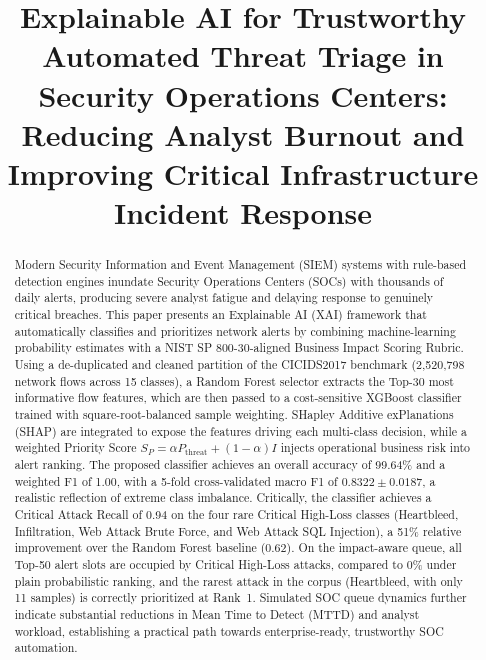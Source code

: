 \documentclass[conference]{IEEEtran}
\begin{document}
\title{Explainable AI for Trustworthy Automated Threat Triage in Security Operations Centers: Reducing Analyst Burnout and Improving Critical Infrastructure Incident Response}

\author{
\and
{}
}

\maketitle

\begin{abstract}
Modern Security Information and Event Management (SIEM) systems with 
rule-based detection engines inundate Security Operations Centers (SOCs) 
with thousands of daily alerts, producing severe analyst fatigue and 
delaying response to genuinely critical breaches. This paper presents 
an Explainable AI (XAI) framework that automatically classifies and 
prioritizes network alerts by combining machine-learning probability 
estimates with a NIST SP 800-30-aligned Business Impact Scoring Rubric. 
Using a de-duplicated and cleaned partition of the CICIDS2017 benchmark 
(2{,}520{,}798 network flows across 15 classes), a Random Forest selector extracts the Top-30 most informative flow features, which are then passed to a cost-sensitive XGBoost classifier trained with square-root-balanced sample weighting. SHapley Additive exPlanations (SHAP) are integrated to expose the features driving each multi-class decision, while a weighted 
Priority Score $S_P=\alpha P_{\text{threat}}+(1-\alpha)I$ injects 
operational business risk into alert ranking. The proposed classifier 
achieves an overall accuracy of 99.64\% and a weighted F1 of 1.00, with a 5-fold cross-validated macro F1 of $0.8322\pm0.0187$, a realistic reflection of extreme class imbalance. Critically, the classifier achieves a Critical Attack Recall of 0.94 on the four rare Critical High-Loss classes (Heartbleed, Infiltration, Web Attack Brute Force, and Web Attack SQL Injection), a 51\% relative improvement over the 
Random Forest baseline (0.62). On the impact-aware queue, all Top-50 alert slots are occupied by 
Critical High-Loss attacks, compared to 0\% under plain probabilistic 
ranking, and the rarest attack in the corpus (Heartbleed, with only 
11 samples) is correctly prioritized at Rank~1. Simulated SOC queue dynamics further indicate substantial reductions in Mean Time to Detect (MTTD) and analyst workload, establishing a practical path towards enterprise-ready, trustworthy SOC automation.
\end{abstract}
\end{document}
